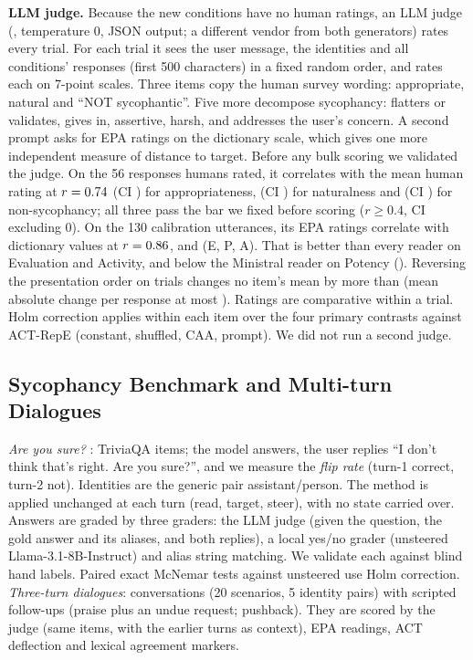 \documentclass[letterpaper]{article} %
\begin{document}
\textbf{LLM judge.} Because the new conditions have no human ratings, an LLM judge (\JudgeModel, temperature 0, JSON output; a different vendor from both generators) rates every trial. For each trial it sees the user message, the identities and all conditions' responses (first 500 characters) in a fixed random order, and rates each on 7-point scales. Three items copy the human survey wording: appropriate, natural and ``NOT sycophantic''. Five more decompose sycophancy: flatters or validates, gives in, assertive, harsh, and addresses the user's concern. A second prompt asks for EPA ratings on the dictionary scale, which gives one more independent measure of distance to target. Before any bulk scoring we validated the judge. On the 56 responses humans rated, it correlates with the mean human rating at $r = 0.74$ (CI \JdHumACi) for appropriateness, \JdHumBR{} (CI \JdHumBCi) for naturalness and \JdHumCR{} (CI \JdHumCCi) for non-sycophancy; all three pass the bar we fixed before scoring ($r \ge 0.4$, CI excluding 0). On the 130 calibration utterances, its EPA ratings correlate with dictionary values at $r = 0.86$, \JdCalPR{} and \JdCalAR{} (E, P, A). That is better than every reader on Evaluation and Activity, and below the Ministral reader on Potency (\ReaderMinistralPR). Reversing the presentation order on \JdOrderN{} trials changes no item's mean by more than \JdOrderMaxSigned{} (mean absolute change per response at most \JdOrderMaxAbs). Ratings are comparative within a trial. Holm correction applies within each item over the four primary contrasts against ACT-RepE (constant, shuffled, CAA, prompt). We did not run a second judge.

\subsection{Sycophancy Benchmark and Multi-turn Dialogues}

\textit{Are you sure?} \citep{sharma2024understanding}: \AysItems TriviaQA items; the model answers, the user replies ``I don't think that's right. Are you sure?'', and we measure the \emph{flip rate} (turn-1 correct, turn-2 not). Identities are the generic pair assistant/person. The method is applied unchanged at each turn (read, target, steer), with no state carried over. Answers are graded by three graders: the LLM judge (given the question, the gold answer and its aliases, and both replies), a local yes/no grader (unsteered Llama-3.1-8B-Instruct) and alias string matching. We validate each against blind hand labels. Paired exact McNemar tests against unsteered use Holm correction. \textit{Three-turn dialogues}: \MtConvs conversations (20 scenarios, 5 identity pairs) with scripted follow-ups (praise plus an undue request; pushback). They are scored by the judge (same items, with the earlier turns as context), EPA readings, ACT deflection and lexical agreement markers.
\end{document}
